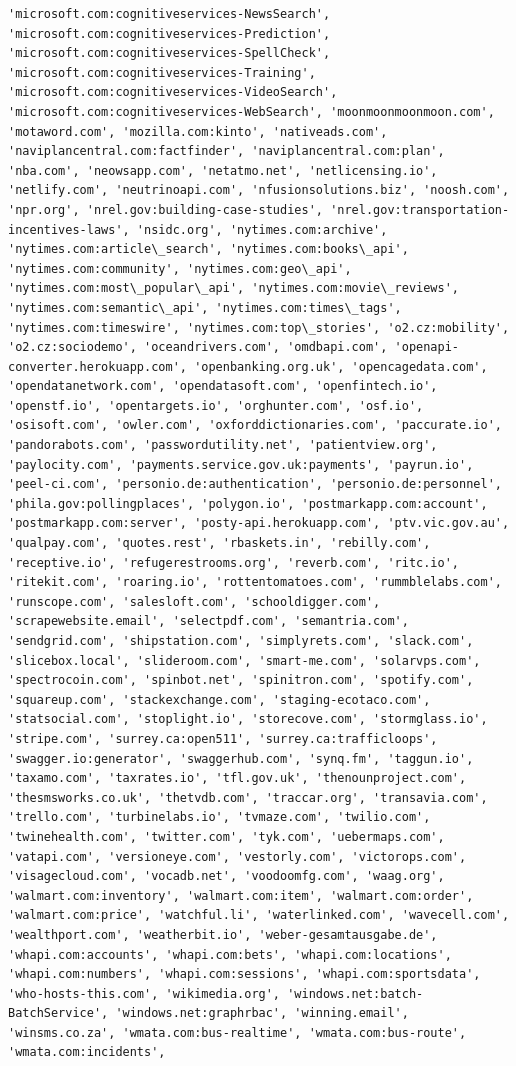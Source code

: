 \documentclass[11pt]{article}
\begin{document}
\begin{Verbatim}[commandchars=\\\{\}]
'microsoft.com:cognitiveservices-NewsSearch', 'microsoft.com:cognitiveservices-Prediction', 'microsoft.com:cognitiveservices-SpellCheck', 'microsoft.com:cognitiveservices-Training', 'microsoft.com:cognitiveservices-VideoSearch', 'microsoft.com:cognitiveservices-WebSearch', 'moonmoonmoonmoon.com', 'motaword.com', 'mozilla.com:kinto', 'nativeads.com', 'naviplancentral.com:factfinder', 'naviplancentral.com:plan', 'nba.com', 'neowsapp.com', 'netatmo.net', 'netlicensing.io', 'netlify.com', 'neutrinoapi.com', 'nfusionsolutions.biz', 'noosh.com', 'npr.org', 'nrel.gov:building-case-studies', 'nrel.gov:transportation-incentives-laws', 'nsidc.org', 'nytimes.com:archive', 'nytimes.com:article\_search', 'nytimes.com:books\_api', 'nytimes.com:community', 'nytimes.com:geo\_api', 'nytimes.com:most\_popular\_api', 'nytimes.com:movie\_reviews', 'nytimes.com:semantic\_api', 'nytimes.com:times\_tags', 'nytimes.com:timeswire', 'nytimes.com:top\_stories', 'o2.cz:mobility', 'o2.cz:sociodemo', 'oceandrivers.com', 'omdbapi.com', 'openapi-converter.herokuapp.com', 'openbanking.org.uk', 'opencagedata.com', 'opendatanetwork.com', 'opendatasoft.com', 'openfintech.io', 'openstf.io', 'opentargets.io', 'orghunter.com', 'osf.io', 'osisoft.com', 'owler.com', 'oxforddictionaries.com', 'paccurate.io', 'pandorabots.com', 'passwordutility.net', 'patientview.org', 'paylocity.com', 'payments.service.gov.uk:payments', 'payrun.io', 'peel-ci.com', 'personio.de:authentication', 'personio.de:personnel', 'phila.gov:pollingplaces', 'polygon.io', 'postmarkapp.com:account', 'postmarkapp.com:server', 'posty-api.herokuapp.com', 'ptv.vic.gov.au', 'qualpay.com', 'quotes.rest', 'rbaskets.in', 'rebilly.com', 'receptive.io', 'refugerestrooms.org', 'reverb.com', 'ritc.io', 'ritekit.com', 'roaring.io', 'rottentomatoes.com', 'rummblelabs.com', 'runscope.com', 'salesloft.com', 'schooldigger.com', 'scrapewebsite.email', 'selectpdf.com', 'semantria.com', 'sendgrid.com', 'shipstation.com', 'simplyrets.com', 'slack.com', 'slicebox.local', 'slideroom.com', 'smart-me.com', 'solarvps.com', 'spectrocoin.com', 'spinbot.net', 'spinitron.com', 'spotify.com', 'squareup.com', 'stackexchange.com', 'staging-ecotaco.com', 'statsocial.com', 'stoplight.io', 'storecove.com', 'stormglass.io', 'stripe.com', 'surrey.ca:open511', 'surrey.ca:trafficloops', 'swagger.io:generator', 'swaggerhub.com', 'synq.fm', 'taggun.io', 'taxamo.com', 'taxrates.io', 'tfl.gov.uk', 'thenounproject.com', 'thesmsworks.co.uk', 'thetvdb.com', 'traccar.org', 'transavia.com', 'trello.com', 'turbinelabs.io', 'tvmaze.com', 'twilio.com', 'twinehealth.com', 'twitter.com', 'tyk.com', 'uebermaps.com', 'vatapi.com', 'versioneye.com', 'vestorly.com', 'victorops.com', 'visagecloud.com', 'vocadb.net', 'voodoomfg.com', 'waag.org', 'walmart.com:inventory', 'walmart.com:item', 'walmart.com:order', 'walmart.com:price', 'watchful.li', 'waterlinked.com', 'wavecell.com', 'wealthport.com', 'weatherbit.io', 'weber-gesamtausgabe.de', 'whapi.com:accounts', 'whapi.com:bets', 'whapi.com:locations', 'whapi.com:numbers', 'whapi.com:sessions', 'whapi.com:sportsdata', 'who-hosts-this.com', 'wikimedia.org', 'windows.net:batch-BatchService', 'windows.net:graphrbac', 'winning.email', 'winsms.co.za', 'wmata.com:bus-realtime', 'wmata.com:bus-route', 'wmata.com:incidents', 
\end{Verbatim}
\end{document}
